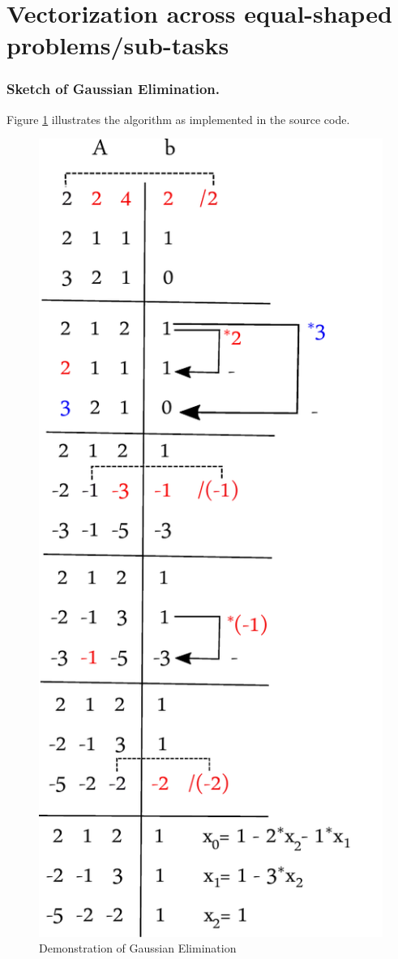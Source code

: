 \documentclass[11pt]{article}
\begin{document}
\section{Vectorization across equal-shaped problems/sub-tasks}
\subsubsection*{Sketch of Gaussian Elimination.}
Figure \ref{graph} illustrates the algorithm as implemented in the source code.

\begin{figure}[h]
  \begin{center}
    \includegraphics{graph.pdf}
    \caption{Demonstration of Gaussian Elimination}
    \label{graph}
  \end{center}
\end{figure}
\end{document}

